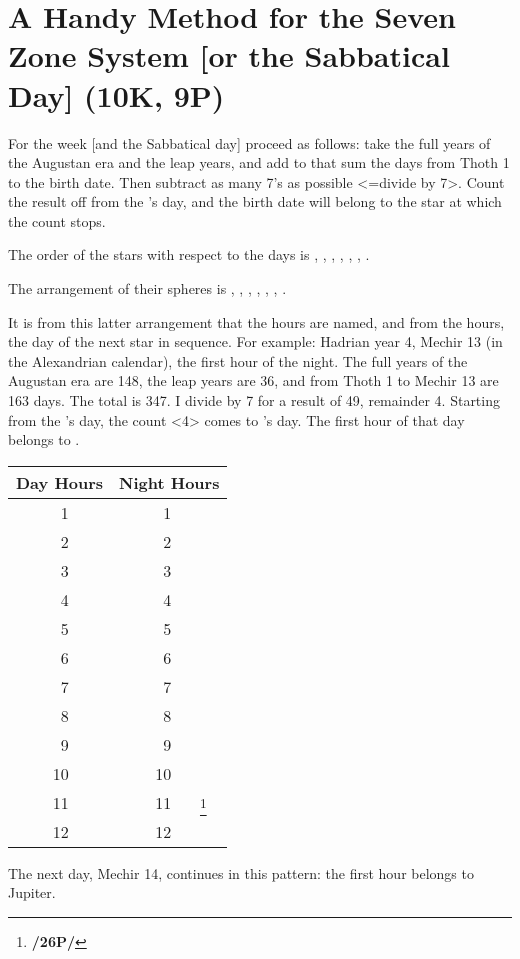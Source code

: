 \section{A Handy Method for the Seven Zone System [or the Sabbatical Day] (10K, 9P)}

For the week [and the Sabbatical day] proceed as follows: take the full years of the Augustan era and the leap years, and add to that sum the days from Thoth 1 to the birth date. Then subtract as many 7’s as possible <=divide by 7>. Count the result off from the \Sun’s day, and the birth date will belong to the star at which the count stops. 

The order of the stars with respect to the days is \Sun, \Moon, \Mars, \Mercury, \Jupiter, \Venus, \Saturn.

The arrangement of their spheres is \Saturn, \Jupiter, \Mars, \Sun, \Venus, \Mercury, \Moon.

\mnm[0.3cm]
It is from this latter arrangement that the hours are named, and from the hours, the day of the next star in sequence. For example: Hadrian year 4, Mechir 13 (in the Alexandrian calendar), the first hour of the night. The full years of the Augustan era are 148, the leap years are 36, and from Thoth 1 to Mechir 13 are 163 days. The total is 347. I divide by 7 for a result of 49, remainder 4. Starting from the \Sun’s day, the count <4>
comes to \Mercury’s day. The first hour of that day belongs to \Mercury.

\begin{longtable}[c]{|r|c|r|c|}
\hline
\multicolumn{2}{|c|}{Day Hours} & 
\multicolumn{2}{|c|}{Night Hours} \\
\hline
\endhead
1  & \Mercury	& 1  & \Sun		\\
2  & \Moon 		& 2  & \Venus	\\
3  & \Saturn 	& 3  & \Mercury	\\
4  & \Jupiter	& 4  & \Moon		\\
5  & \Mars		& 5  & \Saturn	\\
6  & \Sun			& 6  & \Jupiter	\\
7  & \Venus		& 7  & \Mars		\\
8  & \Mercury	& 8  & \Sun		\\
9  & \Moon		& 9  & \Venus	\\
10 & \Saturn		& 10 & \Mercury	\\
11 & \Jupiter	& 11 & \Moon\footnote{\textbf{/26P/}}	\\
12 & \Mars		& 12 & \Saturn	\\
\hline
\end{longtable}

The next day, Mechir 14, continues in this pattern: the first hour belongs to Jupiter.

\newpage